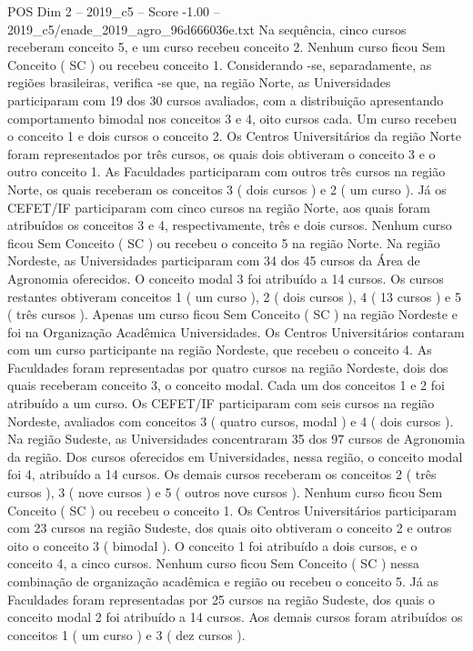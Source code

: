 \begin{textsample}{POS Dim 2 – 2019\_c5 – Score -1.00 – 2019\_c5/enade\_2019\_agro\_96d666036e.txt}
Na sequência, cinco cursos receberam conceito 5, e um curso recebeu conceito 2.
Nenhum curso ficou Sem Conceito ( SC ) ou recebeu conceito 1.
Considerando -se, separadamente, as regiões brasileiras, verifica -se que, na região Norte, as Universidades participaram com 19 dos 30 cursos avaliados, com a distribuição apresentando comportamento bimodal nos conceitos 3 e 4, oito cursos cada.
Um curso recebeu o conceito 1 e dois cursos o conceito 2.
Os Centros Universitários da região Norte foram representados por três cursos, os quais dois obtiveram o conceito 3 e o outro conceito 1.
As Faculdades participaram com outros três cursos na região Norte, os quais receberam os conceitos 3 ( dois cursos ) e 2 ( um curso ).
Já os CEFET/IF participaram com cinco cursos na região Norte, aos quais foram atribuídos os conceitos 3 e 4, respectivamente, três e dois cursos.
Nenhum curso ficou Sem Conceito ( SC ) ou recebeu o conceito 5 na região Norte.
Na região Nordeste, as Universidades participaram com 34 dos 45 cursos da Área de Agronomia oferecidos.
O conceito modal 3 foi atribuído a 14 cursos.
Os cursos restantes obtiveram conceitos 1 ( um curso ), 2 ( dois cursos ), 4 ( 13 cursos ) e 5 ( três cursos ).
Apenas um curso ficou Sem Conceito ( SC ) na região Nordeste e foi na Organização Acadêmica Universidades.
Os Centros Universitários contaram com um curso participante na região Nordeste, que recebeu o conceito 4.
As Faculdades foram representadas por quatro cursos na região Nordeste, dois dos quais receberam conceito 3, o conceito modal.
Cada um dos conceitos 1 e 2 foi atribuído a um curso.
Os CEFET/IF participaram com seis cursos na região Nordeste, avaliados com conceitos 3 ( quatro cursos, modal ) e 4 ( dois cursos ).
Na região Sudeste, as Universidades concentraram 35 dos 97 cursos de Agronomia da região.
Dos cursos oferecidos em Universidades, nessa região, o conceito modal foi 4, atribuído a 14 cursos.
Os demais cursos receberam os conceitos 2 ( três cursos ), 3 ( nove cursos ) e 5 ( outros nove cursos ).
Nenhum curso ficou Sem Conceito ( SC ) ou recebeu o conceito 1.
Os Centros Universitários participaram com 23 cursos na região Sudeste, dos quais oito obtiveram o conceito 2 e outros oito o conceito 3 ( bimodal ).
O conceito 1 foi atribuído a dois cursos, e o conceito 4, a cinco cursos.
Nenhum curso ficou Sem Conceito ( SC ) nessa combinação de organização acadêmica e região ou recebeu o conceito 5.
Já as Faculdades foram representadas por 25 cursos na região Sudeste, dos quais o conceito modal 2 foi atribuído a 14 cursos.
Aos demais cursos foram atribuídos os conceitos 1 ( um curso ) e 3 ( dez cursos ).

\end{textsample}
